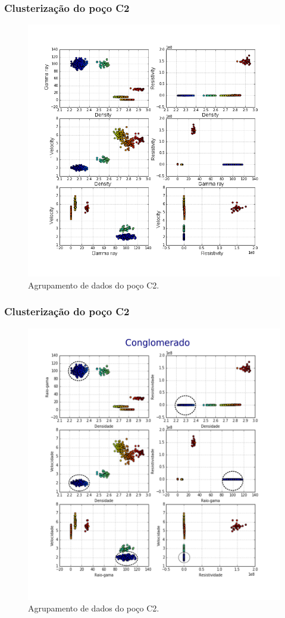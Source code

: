 \documentclass[aspectratio=10]{beamer} %
\begin{document}
\begin{frame}
\frametitle{Clusterização do poço C2}
\begin{figure}[H]
\centering
\includegraphics[scale=0.3]{Imagens/cluterpocoC2.png}
\caption{Agrupamento de dados do poço C2.}
\label{clusterC2}
\end{figure} 
\end{frame}

\begin{frame}
\frametitle{Clusterização do poço C2}
\begin{figure}[H]
\centering
\includegraphics[scale=0.4]{Imagens/conglomeradoC2.png}
\caption{Agrupamento de dados do poço C2.}
\end{figure} 
\end{frame}
\end{document}

